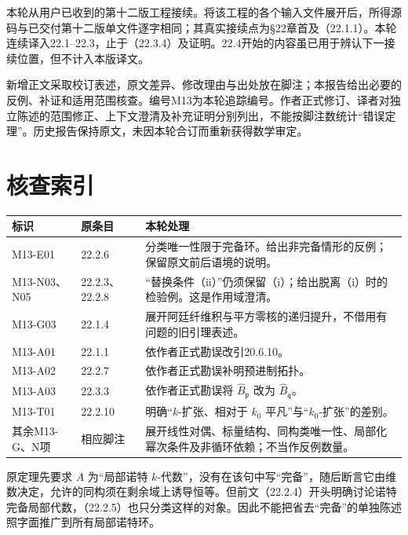 本轮从用户已收到的第十二版工程接续。将该工程的各个输入文件展开后，所得源码与已交付第十二版单文件逐字相同；其真实接续点为§22章首及（22.1.1）。本轮连续译入22.1--22.3，止于（22.3.4）及证明。22.4开始的内容虽已用于辨认下一接续位置，但不计入本版译文。

新增正文采取校订表述，原文差异、修改理由与出处放在脚注；本报告给出必要的反例、补证和适用范围核查。编号M13为本轮追踪编号。作者正式修订、译者对独立陈述的范围修正、上下文澄清及补充证明分别列出，不能按脚注数统计“错误定理”。历史报告保持原文，未因本轮合订而重新获得数学审定。

\section*{核查索引}
\begin{longtable}{@{}p{.17\linewidth}p{.19\linewidth}p{.55\linewidth}@{}}
\toprule 标识&原条目&本轮处理\\ \midrule\endhead
M13-E01&22.2.6&分类唯一性限于完备环。给出非完备情形的反例；保留原文前后语境的说明。\\
M13-N03、N05&22.2.3、22.2.8&“替换条件（ii）”仍须保留（i）；给出脱离（i）时的检验例。这是作用域澄清。\\
M13-G03&22.1.4&展开阿廷纤维积与平方零核的递归提升，不借用有问题的旧引理表述。\\
M13-A01&22.1.1&依作者正式勘误改引20.6.10。\\
M13-A02&22.2.7&依作者正式勘误补明预进制拓扑。\\
M13-A03&22.3.3&依作者正式勘误将 $\widehat B_{\mathfrak p}$ 改为 $\widehat B_{\mathfrak q}$。\\
M13-T01&22.2.10&明确“$k$-扩张、相对于 $k_0$ 平凡”与“$k_0$-扩张”的差别。\\
其余M13-G、N项&相应脚注&展开线性对偶、标量结构、同构类唯一性、局部化幂次条件及非循环依赖；不当作反例数量。\\
\bottomrule
\end{longtable}

原定理先要求 $A$ 为“局部诺特 $k$-代数”，没有在该句中写“完备”，随后断言它由维数决定，允许的同构须在剩余域上诱导恒等。但前文（22.2.4）开头明确讨论诺特完备局部代数，（22.2.5）也只分类这样的对象。因此不能把省去“完备”的单独陈述照字面推广到所有局部诺特环。

